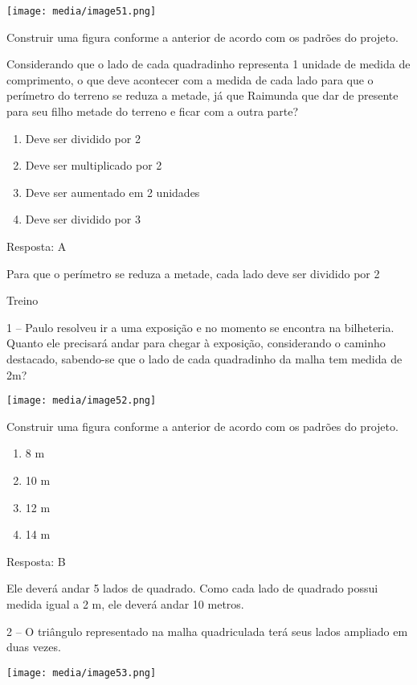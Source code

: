 \texttt{[image: media/image51.png]}

Construir uma figura conforme a anterior de acordo com os padrões do
projeto.

Considerando que o lado de cada quadradinho representa 1 unidade de
medida de comprimento, o que deve acontecer com a medida de cada lado
para que o perímetro do terreno se reduza a metade, já que Raimunda que
dar de presente para seu filho metade do terreno e ficar com a outra
parte?

\begin{enumerate}
\def\labelenumi{\alph{enumi})}
\item
  Deve ser dividido por 2
\item
  Deve ser multiplicado por 2
\item
  Deve ser aumentado em 2 unidades
\item
  Deve ser dividido por 3
\end{enumerate}

Resposta: A

Para que o perímetro se reduza a metade, cada lado deve ser dividido por
2

Treino

1 -- Paulo resolveu ir a uma exposição e no momento se encontra na
bilheteria. Quanto ele precisará andar para chegar à exposição,
considerando o caminho destacado, sabendo-se que o lado de cada
quadradinho da malha tem medida de 2m?

\texttt{[image: media/image52.png]}

Construir uma figura conforme a anterior de acordo com os padrões do
projeto.

\begin{enumerate}
\def\labelenumi{\alph{enumi})}
\item
  8 m
\item
  10 m
\item
  12 m
\item
  14 m
\end{enumerate}

Resposta: B

Ele deverá andar 5 lados de quadrado. Como cada lado de quadrado possui
medida igual a 2 m, ele deverá andar 10 metros.

2 -- O triângulo representado na malha quadriculada terá seus lados
ampliado em duas vezes.

\texttt{[image: media/image53.png]}

